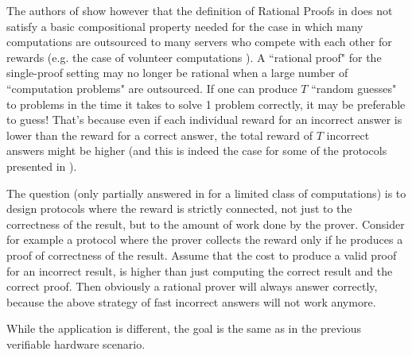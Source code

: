 The authors of \cite{cg15} 
show however that the definition of Rational Proofs in \cite{am,am1} does not satisfy a basic compositional property needed for the case in which many computations are outsourced to many servers who compete with each other for rewards (e.g. the case of volunteer computations \cite{seti}). 
A ``rational proof" for the single-proof setting may no longer be rational when a large number of ``computation problems" are outsourced. %
If one can produce $T$ ``random guesses" to problems in the time it takes to solve 1 problem correctly,  it may be preferable to guess! That's because even if each individual reward for an incorrect answer is lower than the reward for a correct answer, the total reward of $T$ incorrect answers might be higher (and this is indeed the case for some of the protocols presented in \cite{am,am1}). 

The question (only partially answered in \cite{cg15,cg17} for a limited class of computations) is to design protocols where the reward is strictly connected, not just to the correctness of the result, but to the amount of work done by the prover. Consider for example a protocol where the prover collects the reward only if he produces a proof of correctness of the result. Assume that the cost to  produce a valid proof for an incorrect result, is higher than just computing the correct result and the correct proof. Then obviously a rational prover will always answer correctly, because the above strategy of fast incorrect answers will not work anymore. 

While the application is different, the goal is the same as in the previous verifiable hardware scenario. 

